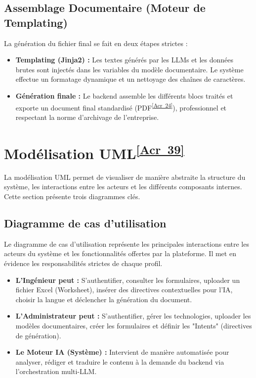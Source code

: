 \documentclass[12pt, a4paper]{report}
\newcommand{\acref}[1]{\textsuperscript{\hyperlink{acr:#1}{[Acr~#1]}}}
\begin{document}
\subsection{Assemblage Documentaire (Moteur de Templating)}
La génération du fichier final se fait en deux étapes strictes :
\begin{itemize}
    \item \textbf{Templating (Jinja2) :} Les textes générés par les LLMs et les données brutes sont injectés dans les variables du modèle documentaire. Le système effectue un formatage dynamique et un nettoyage des chaînes de caractères.
    \item \textbf{Génération finale :} Le backend assemble les différents blocs traités et exporte un document final standardisé (PDF\acref{24}), professionnel et respectant la norme d'archivage de l'entreprise.
\end{itemize}

\section{Modélisation UML\acref{39}}
La modélisation UML permet de visualiser de manière abstraite la structure du système, les interactions entre les acteurs et les différents composants internes. Cette section présente trois diagrammes clés.

\subsection{Diagramme de cas d’utilisation}
Le diagramme de cas d’utilisation représente les principales interactions entre les acteurs du système et les fonctionnalités offertes par la plateforme. Il met en évidence les responsabilités strictes de chaque profil.

\begin{itemize}
    \item \textbf{L’Ingénieur peut :} S'authentifier, consulter les formulaires, uploader un fichier Excel (Worksheet), insérer des directives contextuelles pour l'IA, choisir la langue et déclencher la génération du document.
    \item \textbf{L'Administrateur peut :} S'authentifier, gérer les technologies, uploader les modèles documentaires, créer les formulaires et définir les "Intents" (directives de génération).
    \item \textbf{Le Moteur IA (Système) :} Intervient de manière automatisée pour analyser, rédiger et traduire le contenu à la demande du backend via l'orchestration multi-LLM.
\end{itemize}
\end{document}
